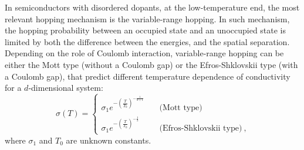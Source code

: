 In semiconductors with disordered dopants, at the low-temperature end, the most relevant hopping mechanism is the variable-range hopping. In such mechanism, the hopping probability between an occupied state and an unoccupied state is limited by both the difference between the energies, and the spatial separation. Depending on the role of Coulomb interaction, variable-range hopping can be either the Mott type (without a Coulomb gap) or the Efros-Shklovskii type (with a Coulomb gap), that predict different temperature dependence of conductivity for a $d$-dimensional system:%
\begin{equation}
    \sigma(T) = %
    \begin{cases}
        \sigma_1 e^{-\left(\frac{T}{T_0}\right)^{-\frac{1}{d+1}}}       & \quad \text{(Mott type)}\\
        \sigma_1 e^{-\left(\frac{T}{T_0}\right)^{-\frac{1}{2}}}  & \quad \text{(Efros-Shklovskii type)}~,
    \end{cases}\label{eq:vrh_types}
\end{equation}%
where $\sigma_1$ and $T_0$ are unknown constants.

